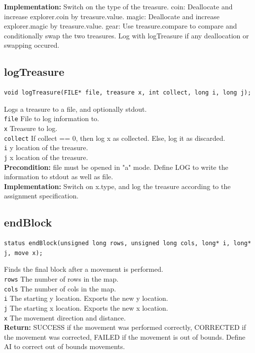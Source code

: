\documentclass{article}
\begin{document}
 
 \textbf{Implementation:}
Switch on the type of the treasure.
coin: Deallocate and increase  explorer.coin by  treasure.value.
magic: Deallocate and increase  explorer.magic by  treasure.value.
gear: Use  treasure.compare to compare and conditionally swap the two treasures.
Log with  logTreasure if any deallocation or swapping occured.


\subsection{logTreasure}
\begin{lstlisting}
void logTreasure(FILE* file, treasure x, int collect, long i, long j);
\end{lstlisting}


 Logs a treasure to a file, and optionally stdout.\\ 
 \texttt{file} File to log information to.\\ 
 \texttt{x} Treasure to log.\\ 
 \texttt{collect} If  collect == 0, then log  x as collected.
     Else, log it as discarded.\\ 
 \texttt{i} y location of the treasure.\\ 
 \texttt{j} x location of the treasure.\\ 
 \textbf{Precondition:}  file must be opened in "a" mode.
 Define LOG to write the information to stdout as well as  file.\\ 
 
 
 \textbf{Implementation:}
Switch on  x.type, and log the treasure according to the assignment specification.


\subsection{endBlock}
\begin{lstlisting}
status endBlock(unsigned long rows, unsigned long cols, long* i, long* j, move x);
\end{lstlisting}


 Finds the final block after a movement is performed.\\ 
 \texttt{rows} The number of rows in the map.\\ 
 \texttt{cols} The number of cols in the map.\\ 
 \texttt{i} The starting y location. Exports the new y location.\\ 
 \texttt{j} The starting x location. Exports the new x location.\\ 
 \texttt{x} The movement direction and distance.\\ 
 \textbf{Return:} SUCCESS if the movement was performed correctly,
         CORRECTED if the movement was corrected,
         FAILED if the movement is out of bounds.
 Define AI to correct out of bounds movements.\\ 
 
\end{document}
